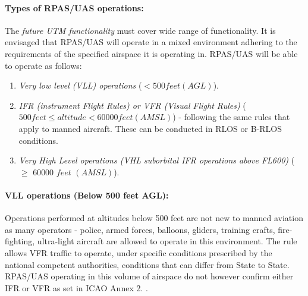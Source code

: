 \paragraph{Types of RPAS/UAS operations:} The \emph{future UTM functionality} must cover wide range of functionality. It is envisaged that RPAS/UAS will operate in a mixed environment adhering to the requirements of the specified airspace it is operating in. RPAS/UAS will be able to operate as follows:

\begin{enumerate}
    \item \emph{Very low level (VLL) operations} ($<500 feet (AGL)$).
    
    \item  \emph{IFR (instrument Flight Rules) or VFR (Visual Flight Rules)} ($500 feet \le altitude < 60 000 feet (AMSL)$) - following the same rules that apply to manned aircraft. These can be conducted in RLOS or B-RLOS conditions.
    
    \item  \emph{Very High Level operations (VHL suborbital IFR operations above FL600)} ($\ge$ $60 000$ $feet$ $(AMSL)$).
\end{enumerate}

\paragraph{VLL operations (Below 500 feet AGL):} Operations performed at altitudes below 500 feet are not new to manned aviation as many operators - police, armed forces, balloons, gliders, training crafts, fire-fighting, ultra-light aircraft are allowed to operate in this environment. The rule allows VFR traffic to operate, under specific conditions prescribed by the national competent authorities, conditions that can differ from State to State. RPAS/UAS operating in this volume of airspace do not however confirm either IFR or VFR as set in ICAO Annex 2. \cite{icaoAnnex2}.

